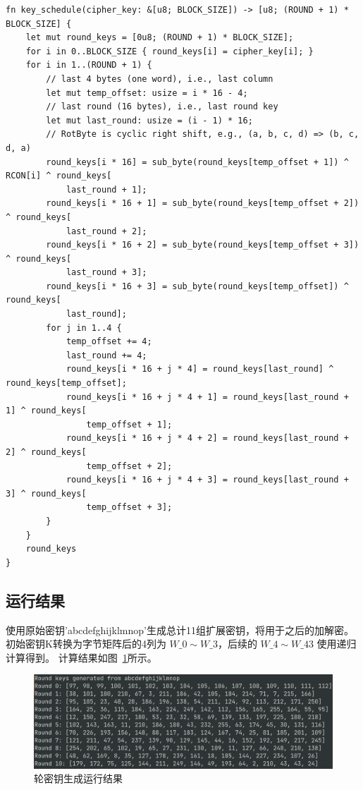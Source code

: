 \documentclass[degree=project,degree-type=project,cjk-font=noto]{thuthesis}
\begin{document}
  \begin{verbatim}
fn key_schedule(cipher_key: &[u8; BLOCK_SIZE]) -> [u8; (ROUND + 1) * BLOCK_SIZE] {
    let mut round_keys = [0u8; (ROUND + 1) * BLOCK_SIZE];
    for i in 0..BLOCK_SIZE { round_keys[i] = cipher_key[i]; }
    for i in 1..(ROUND + 1) {
        // last 4 bytes (one word), i.e., last column
        let mut temp_offset: usize = i * 16 - 4;
        // last round (16 bytes), i.e., last round key
        let mut last_round: usize = (i - 1) * 16;
        // RotByte is cyclic right shift, e.g., (a, b, c, d) => (b, c, d, a)
        round_keys[i * 16] = sub_byte(round_keys[temp_offset + 1]) ^ RCON[i] ^ round_keys[
            last_round + 1];
        round_keys[i * 16 + 1] = sub_byte(round_keys[temp_offset + 2]) ^ round_keys[
            last_round + 2];
        round_keys[i * 16 + 2] = sub_byte(round_keys[temp_offset + 3]) ^ round_keys[
            last_round + 3];
        round_keys[i * 16 + 3] = sub_byte(round_keys[temp_offset]) ^ round_keys[
            last_round];
        for j in 1..4 {
            temp_offset += 4;
            last_round += 4;
            round_keys[i * 16 + j * 4] = round_keys[last_round] ^ round_keys[temp_offset];
            round_keys[i * 16 + j * 4 + 1] = round_keys[last_round + 1] ^ round_keys[
                temp_offset + 1];
            round_keys[i * 16 + j * 4 + 2] = round_keys[last_round + 2] ^ round_keys[
                temp_offset + 2];
            round_keys[i * 16 + j * 4 + 3] = round_keys[last_round + 3] ^ round_keys[
                temp_offset + 3];
        }
    }
    round_keys
}
\end{verbatim}

\subsection{运行结果}

使用原始密钥'abcdefghijklmnop'生成总计11组扩展密钥，将用于之后的加解密。初始密钥K转换为字节矩阵后的4列为 $W\_0 \sim W\_3$，后续的 $W\_4 \sim W\_{43}$ 使用递归计算得到。
计算结果如图~\ref{fig:t3}所示。

\begin{figure}[h]
\centering%
\includegraphics[width=\linewidth]{aes_t3.png}
  \caption{轮密钥生成运行结果}
  \label{fig:t3}
\end{figure}
\end{document}
